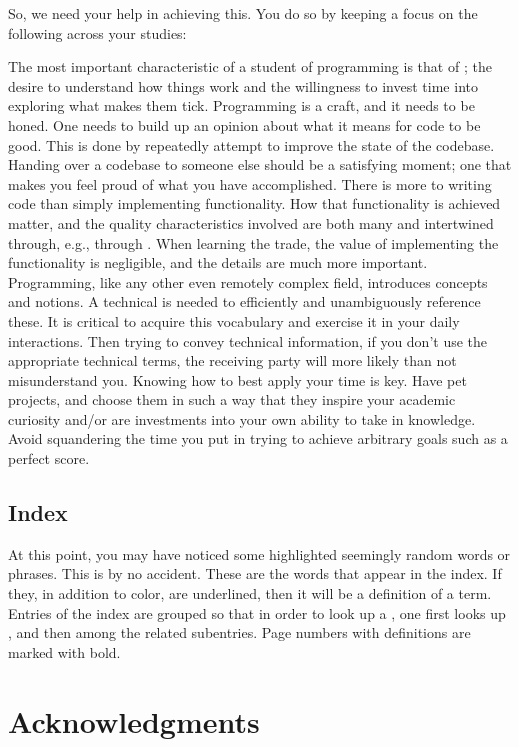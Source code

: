 So, we need your help in achieving this. You do so by keeping a focus on the following across your studies:
\begin{enumerate}
   The most important characteristic of a student of programming is that of ; the desire to understand how things work and the willingness to invest time into exploring what makes them tick.
   Programming is a craft, and it needs to be honed. One needs to build up an opinion about what it means for code to be good. This is done by repeatedly attempt to improve the state of the codebase. Handing over a codebase to someone else should be a satisfying moment; one that makes you feel proud of what you have accomplished.
   There is more to writing code than simply implementing functionality. How that functionality is achieved matter, and the quality characteristics involved are both many and intertwined through, e.g., through . When learning the trade, the value of implementing the functionality is negligible, and the details are much more important.
   Programming, like any other even remotely complex field, introduces concepts and notions. A technical  is needed to efficiently and unambiguously reference these. It is critical to acquire this vocabulary and exercise it in your daily interactions. Then trying to convey technical information, if you don't use the appropriate technical terms, the receiving party will more likely than not misunderstand you.
   Knowing how to best apply your time is key. Have pet projects, and choose them in such a way that they inspire your academic curiosity and/or are investments into your own ability to take in knowledge. Avoid squandering the time you put in trying to achieve arbitrary goals such as a perfect score.
\end{enumerate}

\subsection{Index}

At this point, you may have noticed some highlighted seemingly random words or phrases. This is by no accident. These are the words that appear in the index. If they, in addition to color, are underlined, then it will be a definition of a term. Entries of the index are grouped so that in order to look up a , one first looks up , and then  among the related subentries. Page numbers with definitions are marked with bold.

\section{Acknowledgments}
